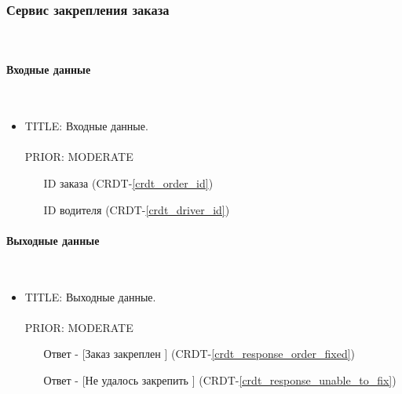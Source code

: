 \subsubsection{Сервис закрепления заказа} \mbox{} \\ \label{fasten_order_service}

	\paragraph{Входные данные} \mbox{} \\ \label{}

      \begin{itemize}

        \item{

          TITLE: Входные данные.\\
          \\
          PRIOR: MODERATE\\

        }

        \begin{itemize}
          \item [ID заказа] (CRDT-\ref{crdt_order_id})
          \item [ID водителя] (CRDT-\ref{crdt_driver_id})
        \end{itemize}

      \end{itemize}

    \paragraph{Выходные данные} \mbox{} \\

      \begin{itemize}

        \item{

          TITLE: Выходные данные.\\
          \\
          PRIOR: MODERATE\\

        }

        \begin{itemize}
          \item [Ответ - [Заказ закреплен]] (CRDT-\ref{crdt_response_order_fixed})
          \item [Ответ - [Не удалось закрепить]] (CRDT-\ref{crdt_response_unable_to_fix})
        \end{itemize}

      \end{itemize}

